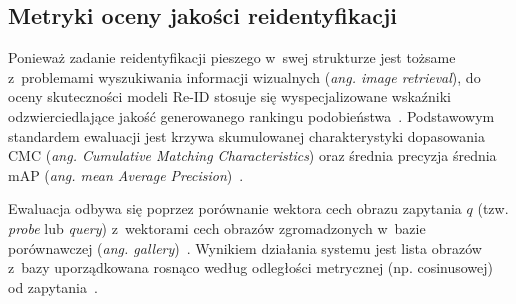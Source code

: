 \subsection{Metryki oceny jakości reidentyfikacji}

Ponieważ zadanie reidentyfikacji pieszego w~swej strukturze jest tożsame z~problemami wyszukiwania
informacji wizualnych (\textit{ang. image retrieval}), do oceny skuteczności modeli Re-ID stosuje
się wyspecjalizowane wskaźniki odzwierciedlające jakość generowanego rankingu
podobieństwa~\cite{hermans2017defense, zheng2017wild}. Podstawowym standardem ewaluacji jest krzywa
skumulowanej charakterystyki dopasowania CMC (\textit{ang. Cumulative Matching Characteristics})
oraz średnia precyzja średnia mAP (\textit{ang. mean Average Precision})~\cite{ge2020mutual,
  zheng2017wild}.

Ewaluacja odbywa się poprzez porównanie wektora cech obrazu zapytania $q$ (tzw. \textit{probe} lub
\textit{query}) z~wektorami cech obrazów zgromadzonych w~bazie porównawczej (\textit{ang.
  gallery})~\cite{zheng2017wild}. Wynikiem działania systemu jest lista obrazów z~bazy uporządkowana
rosnąco według odległości metrycznej (np. cosinusowej) od zapytania~\cite{zheng2017wild}.

